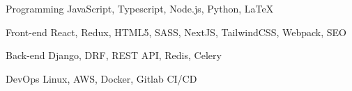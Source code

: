 

\begin{cvskills}

  \cvskill
    {Programming} %
    {JavaScript, Typescript, Node.js, Python, LaTeX} %

  \cvskill
    {Front-end} %
    {React, Redux, HTML5, SASS, NextJS, TailwindCSS, Webpack, SEO} %

  \cvskill
    {Back-end} %
    {Django, DRF, REST API, Redis, Celery} %
    
  \cvskill
    {DevOps} %
    {Linux, AWS, Docker, Gitlab CI/CD} %

\end{cvskills}
